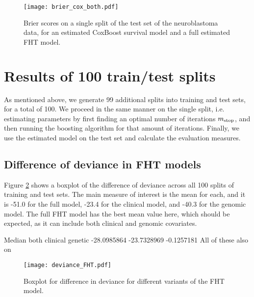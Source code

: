 \begin{figure}
\caption{Brier scores on a single split of the test set of the neuroblastoma data, for an estimated CoxBoost survival model and a full estimated FHT model.}
\label{fig:brier-cox-both}
\centering\texttt{[image: brier\_cox\_both.pdf]}
\end{figure}




\section{Results of 100 train/test splits}
As mentioned above, we generate 99 additional splits into training and test sets, for a total of 100.
We proceed in the same manner on the single split, i.e. estimating parameters by first finding an optimal number of iterations $m_{\text{stop}}$, and then running the boosting algorithm for that amount of iterations.
Finally, we use the estimated model on the test set and calculate the evaluation measures.

\subsection{Difference of deviance in FHT models}
Figure \ref{fig:neuroblastoma-deviances} shows a boxplot of the difference of deviance across all 100 splits of training and test sets.
The main measure of interest is the mean for each, and it is -51.0 for the full model, -23.4 for the clinical model, and -40.3 for the genomic model.
The full FHT model has the best mean value here, which should be expected, as it can include both clinical and genomic covariates.

Median
       both    clinical     genetic 
-28.0985864 -23.7328969  -0.1257181 
All of these also on 

\begin{figure}
\caption{Boxplot for difference in deviance for different variants of the FHT model.}
\label{fig:neuroblastoma-deviances}
\centering
\texttt{[image: deviance\_FHT.pdf]}
\end{figure}

